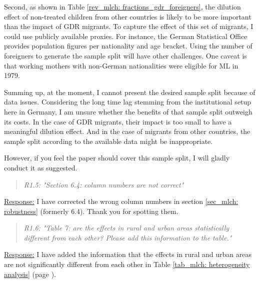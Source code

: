 Second, as shown in Table \ref{rev_mlch: fractions_gdr_foreigners}, the dilution effect of non-treated children from other countries is likely to be more important than the impact of GDR migrants. To capture the effect of this set of migrants, I could use publicly available proxies. For instance, the German Statistical Office provides population figures per nationality and age bracket. Using the number of foreigners to generate the sample split will have other challenges. One caveat is that working mothers with non-German nationalities were eligible for ML in 1979. 


Summing up, at the moment, I cannot present the desired sample split because of data issues. Considering the long time lag stemming from the institutional setup here in Germany, I am unsure whether the benefits of that sample split outweigh its costs. In the case of GDR migrants, their impact is too small to have a meaningful dilution effect. And in the case of migrants from other countries, the sample split according to the available data might be inappropriate.  

However, if you feel the paper should cover this sample split, I will gladly conduct it as suggested.




\bigskip\bigskip
{}
\begin{quote}
	\textit{R1.5: "Section 6.4: column numbers are not correct"}
\end{quote}
\underline{Response:} I have corrected the wrong column numbers in section \ref{sec_mlch: robustness} (formerly 6.4). Thank you for spotting them.

\bigskip\bigskip
{}
\begin{quote}
	\textit{R1.6: "Table 7: are the effects in rural and urban areas statistically different from each other? Please add this information to the table."}
\end{quote}
\underline{Response:} I have added the information that the effects in rural and urban areas are not significantly different from each other in Table \ref{tab_mlch: heterogeneity analysis} (page \pageref{tab_mlch: heterogeneity analysis}).

